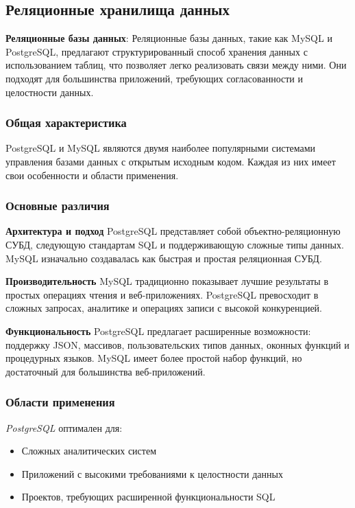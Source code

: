 \subsection{Реляционные хранилища данных}
\textbf{Реляционные базы данных}: Реляционные базы данных, такие как MySQL и PostgreSQL, предлагают структурированный способ хранения данных с использованием таблиц, что позволяет легко реализовать связи между ними. Они подходят для большинства приложений, требующих согласованности и целостности данных.

\subsubsection*{Общая характеристика}

PostgreSQL и MySQL являются двумя наиболее популярными системами управления базами данных с открытым исходным кодом. Каждая из них имеет свои особенности и области применения.

\subsubsection*{Основные различия}

\textbf{Архитектура и подход}
PostgreSQL представляет собой объектно-реляционную СУБД, следующую стандартам SQL и поддерживающую сложные типы данных. MySQL изначально создавалась как быстрая и простая реляционная СУБД.

\textbf{Производительность}
MySQL традиционно показывает лучшие результаты в простых операциях чтения и веб-приложениях. PostgreSQL превосходит в сложных запросах, аналитике и операциях записи с высокой конкуренцией.

\textbf{Функциональность}
PostgreSQL предлагает расширенные возможности: поддержку JSON, массивов, пользовательских типов данных, оконных функций и процедурных языков. MySQL имеет более простой набор функций, но достаточный для большинства веб-приложений.

\subsubsection*{Области применения}

\textit{PostgreSQL} оптимален для:
\begin{itemize}
\item Сложных аналитических систем
\item Приложений с высокими требованиями к целостности данных
\item Проектов, требующих расширенной функциональности SQL
\end{itemize}

